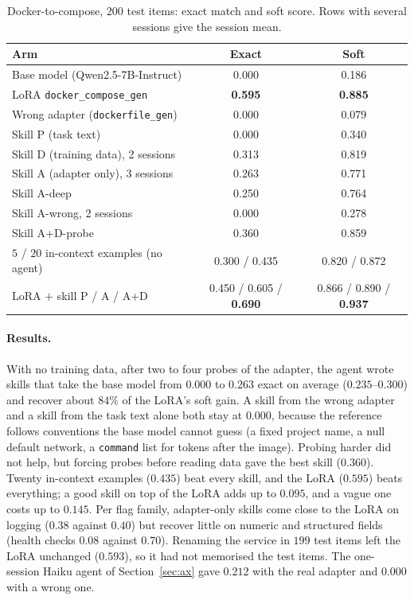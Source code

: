 \documentclass[11pt]{article}
\newcommand{\best}[1]{\textbf{#1}}
\begin{document}
\begin{table}[h]
\centering
\caption{Docker-to-compose, $200$ test items: exact match and soft score. Rows with several sessions give the session mean.}
\label{tab:dc}
\small
\begin{tabular}{@{}lcc@{}}
\toprule
Arm & Exact & Soft\\
\midrule
Base model (Qwen2.5-7B-Instruct) & 0.000 & 0.186\\
LoRA \texttt{docker\_compose\_gen} & \best{0.595} & \best{0.885}\\
Wrong adapter (\texttt{dockerfile\_gen}) & 0.000 & 0.079\\
\midrule
Skill P (task text) & 0.000 & 0.340\\
Skill D (training data), 2 sessions & 0.313 & 0.819\\
Skill A (adapter only), 3 sessions & 0.263 & 0.771\\
Skill A-deep & 0.250 & 0.764\\
Skill A-wrong, 2 sessions & 0.000 & 0.278\\
Skill A+D-probe & 0.360 & 0.859\\
\midrule
$5$ / $20$ in-context examples (no agent) & 0.300 / 0.435 & 0.820 / 0.872\\
\midrule
LoRA $+$ skill P / A / A+D & 0.450 / 0.605 / \best{0.690} & 0.866 / 0.890 / \best{0.937}\\
\bottomrule
\end{tabular}
\end{table}

\paragraph{Results.} With no training data, after two to four probes of the adapter, the agent wrote skills that take the base model from $0.000$ to
$0.263$ exact on average ($0.235$--$0.300$) and recover about $84\%$ of the LoRA's soft gain. A skill from the wrong adapter and a skill from the task
text alone both stay at $0.000$, because the reference follows conventions the base model cannot guess (a fixed project name, a null default network,
a \texttt{command} list for tokens after the image). Probing harder did not help, but forcing probes before reading data gave the best skill ($0.360$).
Twenty in-context examples ($0.435$) beat every skill, and the LoRA ($0.595$) beats everything; a good skill on top of the LoRA adds up to $0.095$, and
a vague one costs up to $0.145$. Per flag family, adapter-only skills come close to the LoRA on logging ($0.38$ against $0.40$) but recover little on
numeric and structured fields (health checks $0.08$ against $0.70$). Renaming the service in $199$ test items left the LoRA unchanged ($0.593$), so it
had not memorised the test items. The one-session Haiku agent of Section~\ref{sec:ax} gave $0.212$ with the real adapter and $0.000$ with a wrong one.
\end{document}
